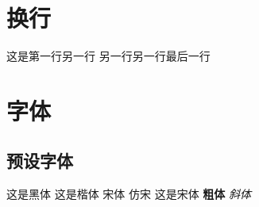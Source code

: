 \documentclass[UTF8]{ctexart}
\begin{document}
    \section{换行}
        这是第一行\linebreak[4]
        另一行\linebreak
        另一行\linebreak[2]
        另一行\linebreak[0]
        最后一行

    \section{字体}
        \subsection{预设字体}
            {这是黑体}\newline
            {这是楷体}\newline
            {\songti 宋体} \newline
            {\fangsong 仿宋} \newline
            {这是宋体}\newline
            \textbf{粗体} \quad \textit{斜体}       %
\end{document}
